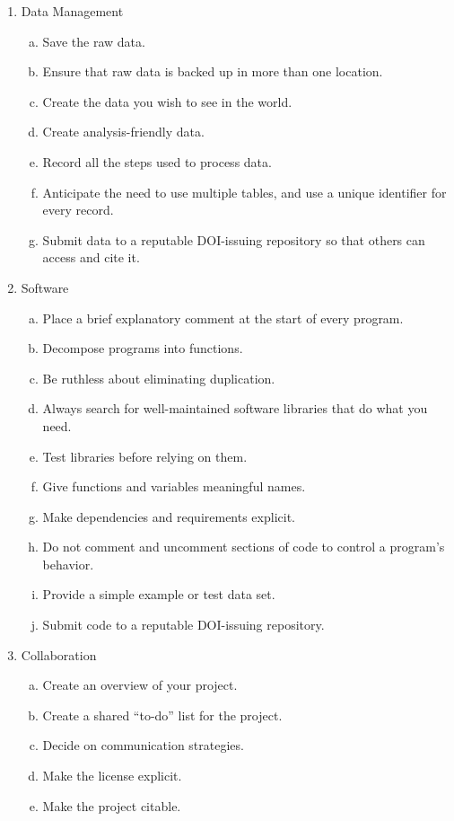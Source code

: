 \documentclass[10pt,letterpaper]{article}
\begin{document}
{\footnotesize
\begin{enumerate}
\item Data Management
  \begin{enumerate}[a)]
  \item Save the raw data.
  \item Ensure that raw data is backed up in more than one location.
  \item Create the data you wish to see in the world.
  \item Create analysis-friendly data.
  \item Record all the steps used to process data.
  \item Anticipate the need to use multiple tables, and use a unique identifier for every record.
  \item Submit data to a reputable DOI-issuing repository so that others can access and cite it.
  \end{enumerate}

\item Software
  \begin{enumerate}[a)]
  \item Place a brief explanatory comment at the start of every program.
  \item Decompose programs into functions.
  \item Be ruthless about eliminating duplication.
  \item Always search for well-maintained software libraries that do what you need.
  \item Test libraries before relying on them.
  \item Give functions and variables meaningful names.
  \item Make dependencies and requirements explicit.
  \item Do not comment and uncomment sections of code to control a program's behavior.
  \item Provide a simple example or test data set.
  \item Submit code to a reputable DOI-issuing repository.
  \end{enumerate}

\item Collaboration
  \begin{enumerate}[a)]
  \item Create an overview of your project.
  \item Create a shared ``to-do'' list for the project.
  \item Decide on communication strategies.
  \item Make the license explicit.
  \item Make the project citable.
  \end{enumerate}


\end{enumerate}}
\end{document}
